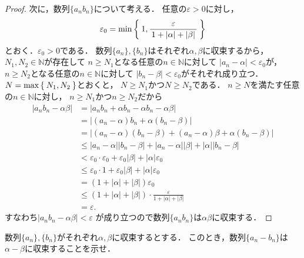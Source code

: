 \begin{proof}
       次に，数列$\{ a_n b_n \}$について考える．
       任意の$\varepsilon > 0$に対し，
       \[
         \varepsilon _ 0 = \min \Set{ 1,  
         {{\,  \varepsilon  \,}\over{\,  1 + \lvert \alpha \rvert + \lvert \beta \rvert  \,}} }
       \]
       とおく．$\varepsilon_0 >0$である．
       数列$\{ a_n \} ,  \{b_n \} $はそれぞれ$\alpha ,  \beta$に収束するから，
       $N_1 ,  N_2 \in \mathbb{N}$が存在して
       $n \geq N_1$となる任意の$n \in \mathbb{N}$に対して
       $\lvert a_n - \alpha \rvert < \varepsilon _0$が，
       $n \geq N_2$となる任意の$n \in \mathbb{N}$に対して
       $\lvert b_n - \beta \rvert < \varepsilon _0$がそれぞれ成り立つ．
       $N = \max \Set{ N_1 ,  N_2}$とおくと，
       $N \geq N_1$かつ$N \geq N_2$である．
       $n \geq N$を満たす任意の$n \in \mathbb{N}$に対し，
       $n \geq N_1 $かつ$n \geq N_2$だから
       \begin{align*}
         \lvert a_n b_n - \alpha \beta \rvert
         & = \lvert a_n b_n + \alpha b_n - \alpha b_n - \alpha \beta \rvert \\
         & = \lvert (a_n - \alpha) b_n + \alpha (b _n -\beta) \rvert \\
         & = \lvert (a_n - \alpha ) ( b_n - \beta )
         +(a_n - \alpha ) \beta + \alpha ( b_n - \beta ) \rvert \\
         & \leq \lvert a_n - \alpha \rvert \lvert b_n - \beta \rvert 
         + \lvert a_n - \alpha \rvert \lvert \beta \rvert 
         + \lvert \alpha \rvert \lvert b_n - \beta \rvert \\
         & < \varepsilon_0 \cdot \varepsilon_0 + \varepsilon_0 \lvert \beta \rvert 
         + \lvert \alpha \rvert \varepsilon_0 \\
         & \leq \varepsilon_0 \cdot 1 + \varepsilon_0 \lvert \beta \rvert 
         + \lvert \alpha \rvert \varepsilon_0 \\ 
         & = (1 + \lvert \alpha \rvert + \lvert \beta \rvert ) \varepsilon _0 \\
         & \leq (1+ \lvert \alpha \rvert + \lvert \beta \rvert ) 
         \cdot \frac{ \varepsilon } { 1 + \lvert \alpha \rvert + \lvert \beta \rvert } \\
         & = \varepsilon .
       \end{align*}
       すなわち$\lvert a_n b_n - \alpha \beta \rvert < \varepsilon$
       が成り立つので数列$\{ a_n b_n \}$は$\alpha \beta$に収束する．
     \end{proof}

     \begin{que} \label{que:suretuconvsa}
       数列$\{ a_n \} ,  \{b _n \}$がそれぞれ$\alpha ,  \beta$に収束するとする．
       このとき，数列$\{ a_n - b_n \}$は$\alpha - \beta$に収束することを示せ．
     \end{que}

